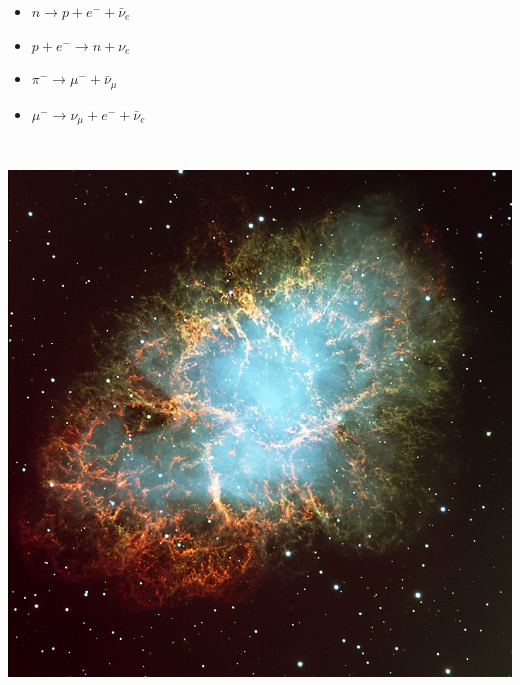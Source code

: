\vspace{1cm}
\begin{itemize}
\item[] $n \rightarrow p+e^{-}+\bar{\nu}_{e}$
\item[] {\blue $p+e^{-} \rightarrow n+\nu_{e}$}
\item[] $\pi^{-} \rightarrow \mu^{-}+\bar{\nu}_{\mu}$
\item[] $\mu^{-} \rightarrow \nu_{\mu}+e^{-}+\bar{\nu}_{e}$
\end{itemize}

\Tr
\onecolumn
\begin{center}
\includegraphics[keepaspectratio,height=15cm]{crab}
\end{center}

